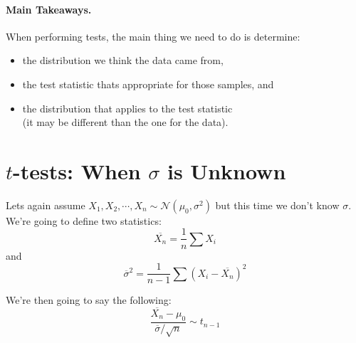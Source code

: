 \paragraph{Main Takeaways.}
When performing tests, the main thing we need to do is determine: 
\begin{itemize}
\item the distribution we think the data came from, 
\item the test statistic thats appropriate for those samples, and 
\item the distribution that applies to the test statistic\\ (it may be different than the one for the data). 
\end{itemize}

\section{$t$-tests: When $\sigma$ is Unknown}
Lets again assume $X_1,X_2,\cdots,X_n\sim\mathcal{N}(\mu_0,\sigma^2)$ but this time we don't know $\sigma$. 
We're going to define two statistics: 
\[\overline{X_n} = \frac{1}{n}\sum X_i\]
and
\[\overline{\sigma}^2 = \frac{1}{n-1}\sum(X_i-\overline{X_n})^2\]

We're then going to say the following:
\[\frac{\overline{X_n}-\mu_0}{\overline{\sigma}/\sqrt{n}}\sim t_{n-1}\]

